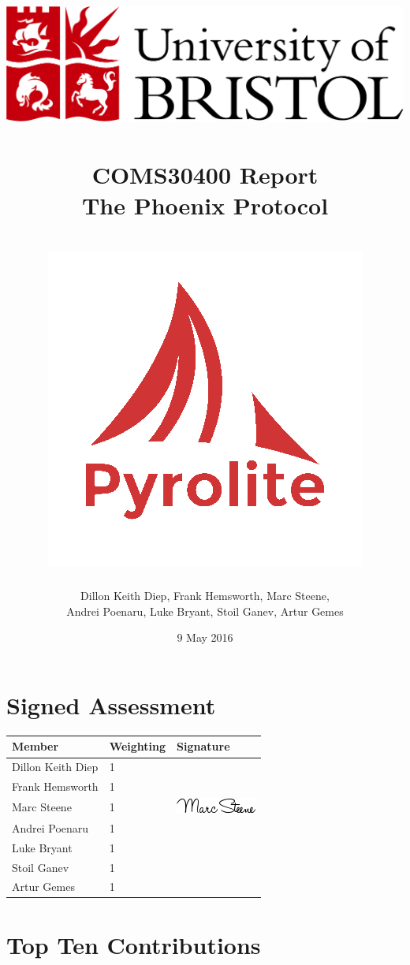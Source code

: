 \documentclass[a4paper,11pt]{article}
\title{
	\includegraphics[scale=0.4]{logos/bristollogo_colour}\\
	\horrule{0.4pt} \\[0.2cm] %
	COMS30400 Report\\
    \Huge The Phoenix Protocol\\
    \horrule{0.4pt} \\[-0.5cm] %
    \vspace{1cm}
\includegraphics[scale=0.35]{images/pyrolite}\\
}
\author{Dillon Keith Diep, Frank Hemsworth, Marc Steene,\\ 
		Andrei Poenaru, Luke Bryant, Stoil Ganev, Artur Gemes}
\date{9 May 2016}
\begin{document}
\maketitle

\clearpage

\section{Signed Assessment}

\begin{table}[ht]
  \centering
  \large
  \begin{tabular}{|M|M|M|}
      \hline
      Member			  & Weighting & Signature \\
      \hline\hline
      Dillon Keith Diep & 1 & \\
      \hline
      Frank Hemsworth   & 1 & \\
      \hline
      Marc Steene       & 1 & \includegraphics[width=.15\textwidth]{marc} \\
      \hline
      Andrei Poenaru    & 1 & \\
      \hline
      Luke Bryant       & 1 & \\
      \hline
      Stoil Ganev       & 1 & \\
      \hline
      Artur Gemes       & 1 & \\
      \hline
  \end{tabular}
\end{table}

\clearpage

\section{Top Ten Contributions}
\end{document}
